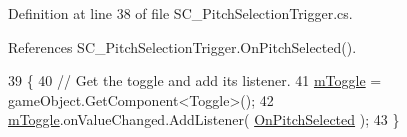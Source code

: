 Definition at line 38 of file S\+C\+\_\+\+Pitch\+Selection\+Trigger.\+cs.



References S\+C\+\_\+\+Pitch\+Selection\+Trigger.\+On\+Pitch\+Selected().


\begin{DoxyCode}
39     \{
40         \textcolor{comment}{// Get the toggle and add its listener.}
41         \hyperlink{group___s_c___p_s_t_priv_var_ga1ecd33f50c82f6ffda81850438907a31}{mToggle} = gameObject.GetComponent<Toggle>();
42         \hyperlink{group___s_c___p_s_t_priv_var_ga1ecd33f50c82f6ffda81850438907a31}{mToggle}.onValueChanged.AddListener( \hyperlink{group___s_c___p_s_t_handlers_ga5f4ea69eee3ed20cb09d56b7281ce861}{OnPitchSelected} );
43     \}
\end{DoxyCode}
